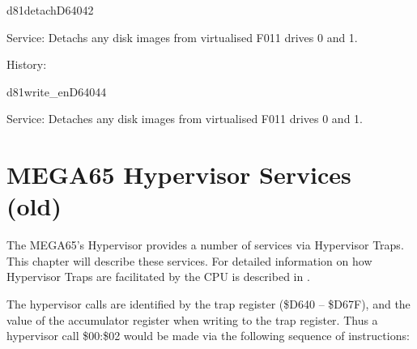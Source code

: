 \newpage
\begin{hyppotrap}{d81detach}{D640}{42}
\item [Service:]
  Detachs any disk images from virtualised F011 drives 0 and 1.
\item [History:]
\end{hyppotrap}


%
\newpage
\begin{hyppotrap}{d81write\_en}{D640}{44}
\item [Service:]
  Detaches any disk images from virtualised F011 drives 0 and 1.
\end{hyppotrap}






\chapter{MEGA65 Hypervisor Services (old)}

The MEGA65's Hypervisor provides a number of services via Hypervisor Traps.
This chapter will describe these services.  For detailed information on how
Hypervisor Traps are facilitated by the CPU is described in .

The hypervisor calls are identified by the trap register (\$D640 -- \$D67F), and
the value of the accumulator register when writing to the trap register.  Thus
a hypervisor call \$00:\$02 would be made via the following sequence of instructions:


